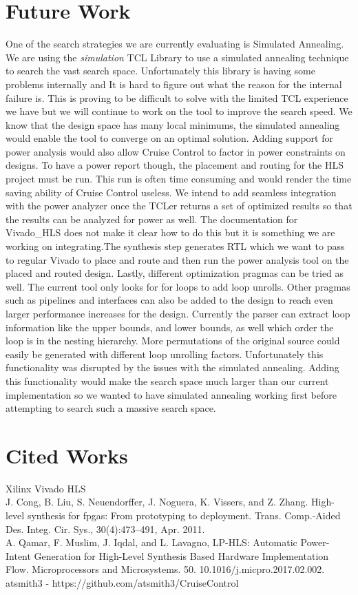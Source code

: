 \documentclass[letterpaper, 10 pt, conference]{IEEEconf}  %
\begin{document}
\section{Future Work}
One of the search strategies we are currently evaluating is Simulated Annealing. We are using the \textit{simulation} TCL Library to use a simulated annealing technique to search the vast search space. Unfortunately this library is having some problems internally and It is hard to figure out what the reason for the internal failure is. This is proving to be difficult to solve with the limited TCL experience we have but we will continue to work on the tool to improve the search speed. We know that the design space has many local minimums, the simulated annealing would enable the tool to converge on an optimal solution.\newline
Adding support for power analysis would also allow Cruise Control to factor in power constraints on designs. To have a power report though, the placement and routing for the HLS project must be run. This run is often time consuming and would render the time saving ability of Cruise Control useless. We intend to add seamless integration with the power analyzer once the TCLer returns a set of optimized results so that the results can be analyzed for power as well. The documentation for Vivado\_HLS does not make it clear how to do this but it is something we are working on integrating.The synthesis step generates RTL which we want to pass to regular Vivado to place and route and then run the power analysis tool on the placed and routed design. \newline
Lastly, different optimization pragmas can be tried as well. The current tool only looks for for loops to add loop unrolls. Other pragmas such as pipelines and interfaces can also be added to the design to reach even larger performance increases for the design. Currently the parser can extract loop information like the upper bounds, and lower bounds, as well which order the loop is in the nesting hierarchy. More permutations of the original source could easily be generated with different loop unrolling factors. Unfortunately this functionality was disrupted by the issues with the simulated annealing. Adding this functionality would make the search space much larger than our current implementation so we wanted to have simulated annealing working first before attempting to search such a massive search space.


\section{Cited Works}
\noindent [1] Xilinx Vivado HLS \\
\noindent [2] J. Cong, B. Liu, S. Neuendorffer, J. Noguera, K. Vissers, and
Z. Zhang. High-level synthesis for fpgas: From prototyping
to deployment. Trans. Comp.-Aided Des. Integ. Cir. Sys.,
30(4):473–491, Apr. 2011.\\
\noindent [3] A. Qamar, F. Muslim, J. Iqdal, and L. Lavagno, LP-HLS: Automatic Power-Intent Generation for High-Level Synthesis Based Hardware Implementation Flow. Microprocessors and Microsystems. 50. 10.1016/j.micpro.2017.02.002.  \\
\noindent [4] atsmith3 - https://github.com/atsmith3/CruiseControl
\end{document}
